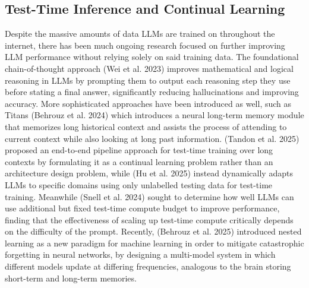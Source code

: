 \documentclass{article} %
\begin{document}
\subsection{Test-Time Inference and Continual Learning}
Despite the massive amounts of data LLMs are trained on throughout the internet, there has been much ongoing research focused on further improving LLM performance without relying solely on said training data. The foundational chain-of-thought approach (Wei et al. 2023) improves mathematical and logical reasoning in LLMs by prompting them to output each reasoning step they use before stating a final answer, significantly reducing hallucinations and improving accuracy. More sophisticated approaches have been introduced as well, such as Titans (Behrouz et al. 2024) which introduces a neural long-term memory module that memorizes long historical context and assists the process of attending to current context while also looking at long past information. (Tandon et al. 2025) proposed an end-to-end pipeline approach for test-time training over long contexts by formulating it as a continual learning problem rather than an architecture design problem, while (Hu et al. 2025) instead dynamically adapts LLMs to specific domains using only unlabelled testing data for test-time training. Meanwhile (Snell et al. 2024) sought to determine how well LLMs can use additional but fixed test-time compute budget to improve performance, finding that the effectiveness of scaling up test-time compute critically depends on the difficulty of the prompt. Recently, (Behrouz et al. 2025) introduced nested learning as a new paradigm for machine learning in order to mitigate catastrophic forgetting in neural networks, by designing a multi-model system in which different models update at differing frequencies, analogous to the brain storing short-term and long-term memories. 


\end{document}
